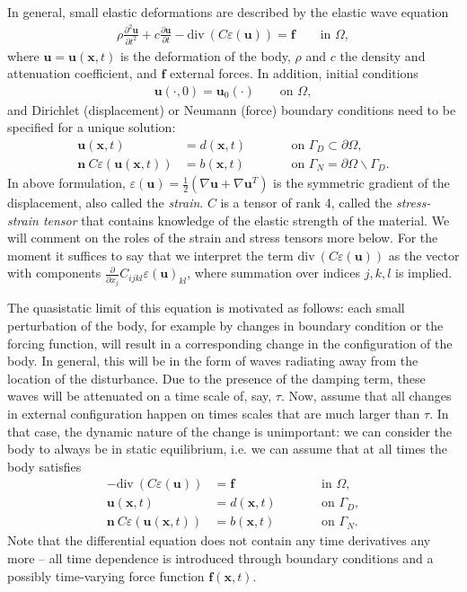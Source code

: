 \documentclass{article}
\renewcommand{\vec}[1]{\mathbf{#1}}
\renewcommand{\div}{\mathrm{div}\ }
\begin{document}
In general, small elastic deformations are described by the elastic wave
equation
\begin{gather*}
  \rho \frac{\partial^2 \vec u}{\partial t^2} 
  + c \frac{\partial \vec u}{\partial t}
  - \div ( C \varepsilon(\vec u)) = \vec f
  \qquad
  \text{in $\Omega$},
\end{gather*}
where $\vec u=\vec u (\vec x,t)$ is the deformation of the body, $\rho$ and
$c$ the density and attenuation coefficient, and $\vec f$ external forces. In
addition, initial conditions
\begin{align*}
  \vec u(\cdot, 0) = \vec u_0(\cdot)
  \qquad
  \text{on $\Omega$},
\end{align*}
and Dirichlet (displacement) or Neumann (force) boundary conditions need
to be specified for a unique solution:
\begin{align*}
  \vec u(\vec x,t) &= d(\vec x,t)
  \qquad
  &&\text{on $\Gamma_D\subset\partial\Omega$},  
  \\
  \vec n \ C \varepsilon(\vec u(\vec x,t)) &= b(\vec x,t)
  \qquad
  &&\text{on $\Gamma_N=\partial\Omega\backslash\Gamma_D$}.
\end{align*}
In above formulation, $\varepsilon(\vec u)= \tfrac 12 (\nabla \vec u + \nabla
\vec u^T)$ is the symmetric gradient of the displacement, also called the
\textit{strain}. $C$ is a tensor of rank 4, called the \textit{stress-strain
  tensor} that contains knowledge of the elastic strength of the material. We
will comment on the roles of the strain and stress tensors more below. For the
moment it suffices to say that we interpret the term $\div ( C
\varepsilon(\vec u))$ as the vector with components $\tfrac \partial{\partial
  x_j} C_{ijkl} \varepsilon(\vec u)_{kl}$, where summation over indices
$j,k,l$ is implied.

The quasistatic limit of this equation is motivated as follows: each small
perturbation of the body, for example by changes in boundary condition or the
forcing function, will result in a corresponding change in the configuration
of the body. In general, this will be in the form of waves radiating away from
the location of the disturbance. Due to the presence of the damping term,
these waves will be attenuated on a time scale of, say, $\tau$. Now, assume
that all changes in external configuration happen on times scales that are
much larger than $\tau$. In that case, the dynamic nature of the change is
unimportant: we can consider the body to always be in static equilibrium,
i.e. we can assume that at all times the body satisfies
\begin{align*}
  - \div ( C \varepsilon(\vec u)) &= \vec f
  &&\text{in $\Omega$},
  \\
  \vec u(\vec x,t) &= d(\vec x,t)
  \qquad
  &&\text{on $\Gamma_D$},
  \\
  \vec n \ C \varepsilon(\vec u(\vec x,t)) &= b(\vec x,t)
  \qquad
  &&\text{on $\Gamma_N$}.
\end{align*}
Note that the differential equation does not contain any time derivatives any
more -- all time dependence is introduced through boundary conditions and a
possibly time-varying force function $\vec f(\vec x,t)$.
\end{document}
